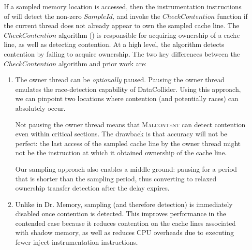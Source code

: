 \documentclass[letterpaper,twocolumn,10pt]{article}
\newcommand{\TextToolname}{Malcontent}
\newcommand{\Toolname}{\textsc{\TextToolname{}}}
\begin{document}
If a sampled memory location is accessed, then the instrumentation instructions of  will detect the non-zero
$SampleId$, and invoke the $CheckContention$ function if the current thread does not already appear to own the sampled cache line.
The $CheckContention$ algorithm () is responsible for acquiring ownership of a cache line, as well as detecting
contention. At a high level, the algorithm detects contention by failing to acquire ownership. The two key differences between the
$CheckContention$ algorithm and prior work are: \begin{enumerate}
	\item The owner thread can be \emph{optionally} paused. Pausing the owner thread emulates the race-detection capability of
DataCollider. Using this approach, we can pinpoint two locations where contention (and potentially races) can
absolutely occur.

Not pausing the owner thread means that \Toolname{} can detect contention even within critical sections. The drawback
is that accuracy will not be perfect: the last access of the sampled cache line by the owner thread might not be the
instruction at which it obtained ownership of the cache line.

Our sampling approach also enables a middle ground: pausing for a period that is shorter than the sampling period, thus converting
to relaxed ownership transfer detection after the delay expires.

	\item Unlike in Dr. Memory, sampling (and therefore detection) is immediately disabled once contention is detected. This improves
performance in the contended case because it reduces contention on the cache lines associated with shadow memory, as well as reduces
CPU overheads due to executing fewer inject instrumentation instructions.
\end{enumerate}


\end{document}

